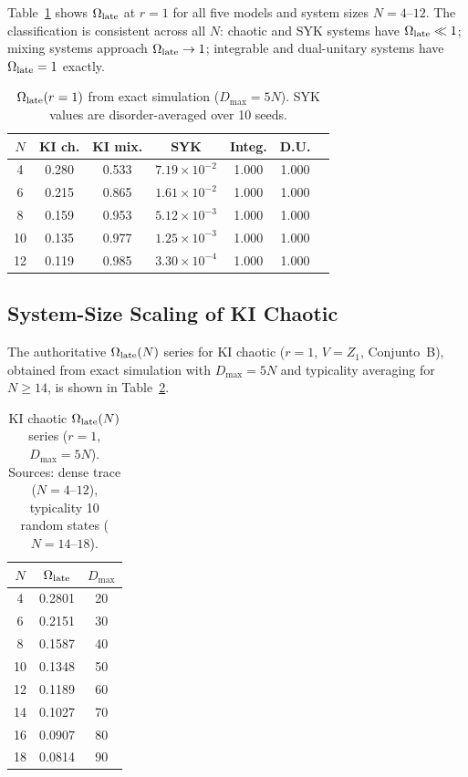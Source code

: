 \documentclass[twocolumn,showpacs,preprintnumbers,amsmath,amssymb,aps,prl]{revtex4-2}
\begin{document}
Table~\ref{tab:classification} shows $\Omega_{\rm late}$ at $r=1$ for all five
models and system sizes $N = 4$--$12$. The classification is consistent across
all $N$: chaotic and SYK systems have $\Omega_{\rm late} \ll 1$; mixing systems
approach $\Omega_{\rm late} \to 1$; integrable and dual-unitary systems have
$\Omega_{\rm late} = 1$ exactly.

\begin{table}[h]
\caption{$\Omega_{\rm late}(r=1)$ from exact simulation ($D_{\max} = 5N$).
SYK values are disorder-averaged over 10 seeds.}
\label{tab:classification}
\begin{ruledtabular}
\begin{tabular}{ccccccc}
$N$ & KI ch. & KI mix. & SYK & Integ. & D.U. \\
\hline
4  & 0.280 & 0.533 & $7.19\times10^{-2}$ & 1.000 & 1.000 \\
6  & 0.215 & 0.865 & $1.61\times10^{-2}$ & 1.000 & 1.000 \\
8  & 0.159 & 0.953 & $5.12\times10^{-3}$ & 1.000 & 1.000 \\
10 & 0.135 & 0.977 & $1.25\times10^{-3}$ & 1.000 & 1.000 \\
12 & 0.119 & 0.985 & $3.30\times10^{-4}$ & 1.000 & 1.000 \\
\end{tabular}
\end{ruledtabular}
\end{table}

\subsection{System-Size Scaling of KI Chaotic}

The authoritative $\Omega_{\rm late}(N)$ series for KI chaotic ($r=1$,
$V = Z_1$, Conjunto~B), obtained from exact simulation with $D_{\max} = 5N$ and
typicality averaging for $N \geq 14$, is shown in Table~\ref{tab:scaling}.

\begin{table}[h]
\caption{KI chaotic $\Omega_{\rm late}(N)$ series ($r=1$, $D_{\max}=5N$).
Sources: dense trace ($N=4$--$12$), typicality 10 random states ($N=14$--$18$).}
\label{tab:scaling}
\begin{ruledtabular}
\begin{tabular}{ccc}
$N$ & $\Omega_{\rm late}$ & $D_{\max}$ \\
\hline
4  & 0.2801 & 20 \\
6  & 0.2151 & 30 \\
8  & 0.1587 & 40 \\
10 & 0.1348 & 50 \\
12 & 0.1189 & 60 \\
14 & 0.1027 & 70 \\
16 & 0.0907 & 80 \\
18 & 0.0814 & 90 \\
\end{tabular}
\end{ruledtabular}
\end{table}
\end{document}
